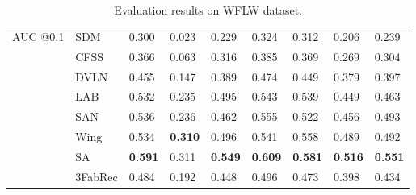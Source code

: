 \documentclass[10pt,twocolumn,letterpaper]{article}
\begin{document}
\begin{table}
\begin{center}
\begin{tabular}{p{0.5cm}| p{1.55cm}| p{0.34cm} p{0.34cm}p{0.34cm}p{0.34cm}p{0.34cm}p{0.34cm}p{0.40cm}}
			\multirow{4}{0.5cm}{AUC @0.1}        
& SDM \cite{xiong2013supervised} & 0.300 & 0.023 & 0.229 & 0.324 & 0.312 & 0.206 & 0.239\\
			& CFSS \cite{Zhu2015} & 0.366 & 0.063 & 0.316 & 0.385 & 0.369 & 0.269 & 0.304 \\
			& DVLN \cite{Wu2015}  & 0.455 & 0.147 & 0.389 & 0.474 & 0.449 & 0.379 & 0.397 \\
			& LAB \cite{Wu2018}   & 0.532 & 0.235 & 0.495 & 0.543 & 0.539 & 0.449 & 0.463  \\
			& SAN \cite{Dong2019} & 0.536 & 0.236 & 0.462 & 0.555 & 0.522 & 0.456 & 0.493  \\
			& Wing \cite{Wu2018}  & 0.534 & \bf 0.310 & 0.496 & 0.541 & 0.558 & 0.489 & 0.492  \\
			& SA \cite{Qian2019}  & \bf 0.591 & 0.311 & \bf 0.549 & \bf 0.609 & \bf 0.581 & \bf 0.516 & \bf 0.551 \\
			\cmidrule{2-9}
			& 3FabRec             & 0.484 & 0.192 &0.448 &0.496 &0.473 & 0.398 & 0.434 \\
			
			\bottomrule
		\end{tabular}	
	\end{center}
	\vspace{-0.5cm}
	\caption{\small Evaluation results on WFLW dataset.}	
	\label{tab:SOAWFLW}
	\vspace{-0.3cm}\end{table}
\end{document}
